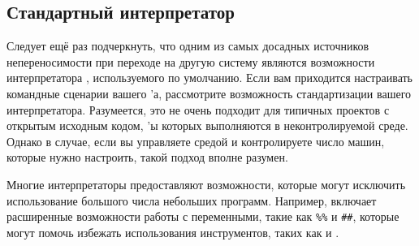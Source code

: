 \subsection*{Стандартный интерпретатор}

Следует ещё раз подчеркнуть, что одним из самых досадных источников
непереносимости при переходе на другую систему являются возможности
интерпретатора , используемого \GNUmake{} по
умолчанию. Если вам приходится настраивать командные сценарии вашего
\Makefile{}'а, рассмотрите возможность стандартизации вашего
интерпретатора. Разумеется, это не очень подходит для типичных
проектов с открытым исходным кодом, \Makefile{}'ы которых выполняются
в неконтролируемой среде. Однако в случае, если вы управляете средой и
контролируете число машин, которые нужно настроить, такой подход
вполне разумен.

Многие интерпретаторы предоставляют возможности, которые могут
исключить использование большого числа небольших программ. Например,
 включает расширенные возможности работы с переменными,
такие как \texttt{\%\%} и \texttt{\#\#}, которые могут помочь избежать
использования инструментов, таких как  и .
